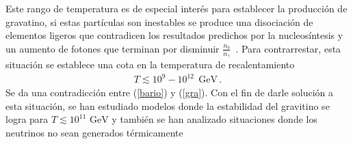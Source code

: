 Este rango de temperatura es de especial interés para establecer la producción de gravatino, si estas partículas son inestables se produce una disociación de elementos ligeros que contradicen los resultados predichos por la nucleosíntesis y un aumento de fotones que terminan por disminuir $\frac{n_{b}}{n_{\gamma}}$~\cite{Davidson:2002qv}. Para contrarrestar, esta situación se establece una cota en la temperatura de recalentamiento
\begin{align}
\label{gra}
T\lesssim10^{9}-10^{12} \ \ \text{GeV}\, . 
\end{align}
Se da una contradicción entre (\ref{bario}) y (\ref{gra}). Con el fin de darle solución a esta situación, se han estudiado modelos donde la estabilidad del gravitino se logra para $T\lesssim10^{11}$ $\text{GeV}$ y también se han analizado situaciones donde los neutrinos no sean generados térmicamente

